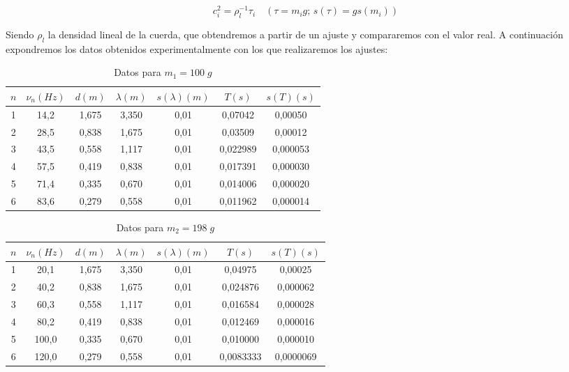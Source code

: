 \documentclass[a4paper,12pt,titlepage]{article}
\begin{document}
\begin{equation}
    c_i^2 = \rho_l^{-1}\tau_i \quad (\tau=m_ig;\,s(\tau)=gs(m_i))
    \label{dens lineal}
\end{equation}

Siendo $\rho_l$ la densidad lineal de la cuerda, que obtendremos a partir de un ajuste y compararemos con el valor real. A continuación expondremos los datos obtenidos experimentalmente con los que realizaremos los ajustes:

\begin{table}[h!]
    \centering
    \begin{tabular}{|c|c|c|c|c|c|c|}
    \hline
    $n$ & $\nu_n(Hz)$ & $d(m)$& $\lambda(m)$ & $s(\lambda)(m)$ &$T(s)$ & $s(T)(s)$ \\ \hline
    1  & 14,2 & 1,675 & 3,350 & 0,01 & 0,07042  & 0,00050  \\ \hline
    2  & 28,5 & 0,838 & 1,675 & 0,01 & 0,03509  & 0,00012  \\ \hline
    3  & 43,5 & 0,558 & 1,117 & 0,01 & 0,022989 & 0,000053 \\ \hline
    4  & 57,5 & 0,419 & 0,838 & 0,01 & 0,017391 & 0,000030 \\ \hline
    5  & 71,4 & 0,335 & 0,670 & 0,01 & 0,014006 & 0,000020 \\ \hline
    6  & 83,6 & 0,279 & 0,558 & 0,01 & 0,011962 & 0,000014 \\ \hline
    \end{tabular}
    \caption{Datos para $m_1=100\;g$}
    \label{masa1}
    \end{table}

\begin{table}[h!]
    \centering
    \begin{tabular}{|c|c|c|c|c|c|c|}
        \hline
        $n$ & $\nu_n(Hz)$ & $d(m)$& $\lambda(m)$ & $s(\lambda)(m)$ &$T(s)$ & $s(T)(s)$ \\ \hline
        1 & 20,1 & 1,675 & 3,350 & 0,01 & 0,04975   & 0,00025   \\ \hline
        2 & 40,2 & 0,838 & 1,675 & 0,01 & 0,024876  & 0,000062  \\ \hline
        3 & 60,3 & 0,558 & 1,117 & 0,01 & 0,016584  & 0,000028  \\ \hline
        4 & 80,2 & 0,419 & 0,838 & 0,01 & 0,012469  & 0,000016  \\ \hline
        5 & 100,0  & 0,335 & 0,670 & 0,01 & 0,010000  & 0,000010  \\ \hline
        6 & 120,0  & 0,279 & 0,558 & 0,01 & 0,0083333 & 0,0000069 \\ \hline
        \end{tabular}
        \caption{Datos para $m_2=198\;g$}
        \label{masa2}
        \end{table}
\end{document}
